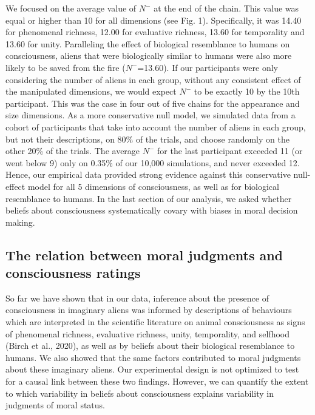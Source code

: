\documentclass[10pt, letterpaper]{article}
\begin{document}
We focused on the average value of \(N^-\) at the end of the chain. This
value was equal or higher than 10 for all dimensions (see Fig. 1).
Specifically, it was 14.40 for phenomenal richness, 12.00 for evaluative
richness, 13.60 for temporality and 13.60 for unity. Paralleling the
effect of biological resemblance to humans on consciousness, aliens that
were biologically similar to humans were also more likely to be saved
from the fire (\(N^-\)=13.60). If our participants were only considering
the number of aliens in each group, without any consistent effect of the
manipulated dimensions, we would expect \(N^-\) to be exactly 10 by the
10th participant. This was the case in four out of five chains for the
appearance and size dimensions. As a more conservative null model, we
simulated data from a cohort of participants that take into account the
number of aliens in each group, but not their descriptions, on 80\% of
the trials, and choose randomly on the other 20\% of the trials. The
average \(N^-\) for the last participant exceeded 11 (or went below 9)
only on 0.35\% of our 10,000 simulations, and never exceeded 12. Hence,
our empirical data provided strong evidence against this conservative
null-effect model for all 5 dimensions of consciousness, as well as for
biological resemblance to humans. In the last section of our analysis,
we asked whether beliefs about consciousness systematically covary with
biases in moral decision making.

\hypertarget{the-relation-between-moral-judgments-and-consciousness-ratings}{%
\subsection{The relation between moral judgments and consciousness
ratings}\label{the-relation-between-moral-judgments-and-consciousness-ratings}}

So far we have shown that in our data, inference about the presence of
consciousness in imaginary aliens was informed by descriptions of
behaviours which are interpreted in the scientific literature on animal
consciousness as signs of phenomenal richness, evaluative richness,
unity, temporality, and selfhood (Birch et al., 2020), as well as by
beliefs about their biological resemblance to humans. We also showed
that the same factors contributed to moral judgments about these
imaginary aliens. Our experimental design is not optimized to test for a
causal link between these two findings. However, we can quantify the
extent to which variability in beliefs about consciousness explains
variability in judgments of moral status.
\end{document}
